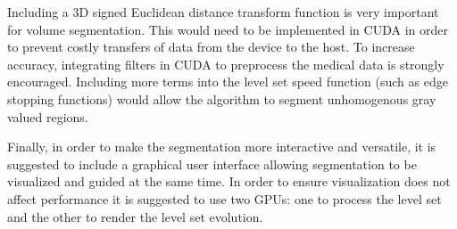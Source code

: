 Including a 3D signed Euclidean distance transform function is very important for volume segmentation. This would need to be implemented in CUDA in order to prevent costly transfers of data from the device to the host. To increase accuracy, integrating filters in CUDA to preprocess the medical data is strongly encouraged. Including more terms into the level set speed function (such as edge stopping functions) would allow the algorithm to segment unhomogenous gray valued regions. 

Finally, in order to make the segmentation more interactive and versatile, it is suggested to include a graphical user interface allowing segmentation to be visualized and guided at the same time. In order to ensure visualization does not affect performance it is suggested to use two GPUs: one to process the level set and the other to render the level set evolution.